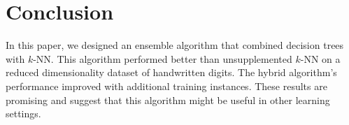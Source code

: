 \section{Conclusion}

In this paper, we designed an ensemble algorithm that combined decision trees with $k$-NN. This algorithm performed better than unsupplemented $k$-NN on a reduced dimensionality dataset of handwritten digits. The hybrid algorithm's performance improved with additional training instances. These results are promising and suggest that this algorithm might be useful in other learning settings.
